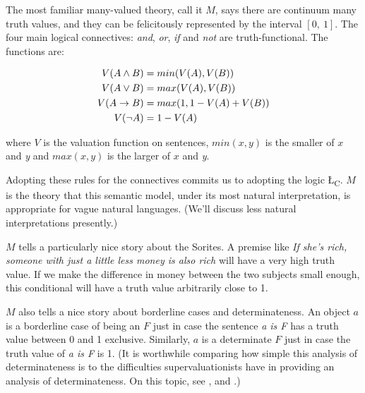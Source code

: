 The most familiar many-valued theory, call it \(M\), says there are continuum many truth values, and they can be felicitously represented by the interval \([0,~1]\). The four main logical connectives: \textit{and}, \textit{or}, \textit{if} and \textit{not} are truth-functional. The functions are: 

\begin{align}
V(A \wedge B) &= min(V(A), V(B))  \hspace*{\fill} \\
V(A \vee B) &= max(V(A), V(B))  \hspace*{\fill} \\
V(A \rightarrow B) &= max(1, 1 - V(A) + V(B))  \hspace*{\fill} \\
V(\neg A) &= 1 - V(A)
\end{align} 

%
%
%
%

\noindent where \(V\) is the valuation function on sentences, \(min(x, y)\) is the smaller of \(x\) and \textit{y }and \(max(x, y)\) is the larger of \(x\) and \textit{y}.

Adopting these rules for the connectives commits us to adopting the logic {\L}\textsubscript{C}. \(M\) is the theory that this semantic model, under its most natural interpretation, is appropriate for vague natural languages. (We'll discuss less natural interpretations presently.) 

\(M\) tells a particularly nice story about the Sorites. A premise like \textit{If she's rich, someone with just a little less money is also rich} will have a very high truth value. If we make the difference in money between the two subjects small enough, this conditional will have a truth value arbitrarily close to 1. 

\(M\) also tells a nice story about borderline cases and determinateness. An object \(a\) is a borderline case of being an \(F\) just in case the sentence \textit{a is F} has a truth value between 0 and 1 exclusive. Similarly, \(a\) is a determinate \(F\) just in case the truth value of \textit{a is F} is 1. (It is worthwhile comparing how simple this analysis of determinateness is to the difficulties supervaluationists have in providing an analysis of determinateness. On this topic, see \citet{Williamson1995}, \citet{McGee1998} and \citet{Williamson2004-WILRTM}.)

